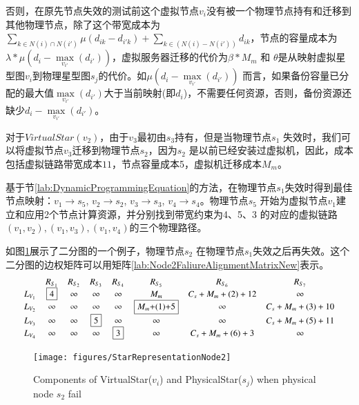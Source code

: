 否则，在原先节点失效的测试前这个虚拟节点$v_i$没有被一个物理节点持有和迁移到其他物理节点，除了这个带宽成本为${\sum\limits_{k \in N(i) \cap N(i')} {\mu({d_{ik}} - {d_{i'k}})}  + \sum\limits_{k \in \left( {N(i) - N(i')} \right)} {{d_{ik}}} }$，节点的容量成本为${\lambda * \mu({d_i} - \mathop {\max }\limits_{{v_{i'}}} \left( {{d_{i'}}} \right))}$，虚拟服务器迁移的代价为${\beta * {M_m}}$ 和 $\theta$是从映射虚拟星型图$v_i$到物理星型图$s_j$的代价。如${\mu({d_i} - \mathop {\max }\limits_{{v_{i'}}} \left( {{d_{i'}}} \right))}$ 而言，如果备份容量已分配的最大值${\mathop {\max }\limits_{{v_{i'}}} \left( {{d_{i'}}} \right)}$大于当前映射(即$d_i$)，不需要任何资源，否则，备份资源还缺少${{d_i} - \mathop {\max }\limits_{{v_{i'}}} \left( {{d_{i'}}} \right)}$。

对于$VirtualStar(v_2)$，由于$v_3$最初由$s_3$持有，但是当物理节点$s_1$ 失效时，我们可以将虚拟节点$v_3$迁移到物理节点$s_2$，因为$s_2$ 是以前已经安装过虚拟机，因此，成本包括虚拟链路带宽成本$11$，节点容量成本5，虚拟机迁移成本$M_m$。

基于节\ref{lab:DynamicProgrammingEquation}的方法，在物理节点$s_1$失效时得到最佳节点映射：$v_1 \rightarrow s_5$, $v_2 \rightarrow s_2$, $v_3 \rightarrow s_3$, $v_4 \rightarrow s_4$。物理节点$s_5$ 开始为虚拟节点$v_1$建立和应用2个节点计算资源，并分别找到带宽约束为4、5、3 的对应的虚拟链路$(v_1,v_2),(v_1,v_3),(v_1,v_4)$的三个物理路径。

如图\ref{fig:StarRepresentationNode2}展示了二分图的一个例子，物理节点$s_2$ 在物理节点$s_1$失效之后再失效。这个二分图的边权矩阵可以用矩阵\ref{lab:Node2FaliureAlignmentMatrixNew}表示。
\begin{equation*}
\small{
 {\begin{array}{*{20}{c}}
&R_{S_{1}}&R_{S_{2}}&R_{S_3}&R_{S_4}&R_{S_5}&R_{S_6}&R_{S_{7}}\\
{L_{V_1}}&\fbox{4}&\infty&\infty&\infty&M_{m}&C_{s}+M_{m}+(2)+12&\infty\\
L_{V_2}&\infty&\infty&\infty&\infty&\fbox{$M_{m}$+(1)+5}&\infty&C_{s}+M_{m}+(3)+10\\
L_{V_3}&\infty&\infty&\fbox{5}&\infty&\infty&\infty&C_{s}+M_{m}+(5)+11\\
L_{V_4}&\infty&\infty&\infty&\fbox{3}&\infty&C_{s}+M_{m}+(6)+3&\infty\\
\end{array}}
}
\label{lab:Node2FaliureAlignmentMatrixNew}
\end{equation*}

\begin{figure}
\centering
\texttt{[image: figures/StarRepresentationNode2]}\\
  \caption{Components of VirtualStar($v_i$) and PhysicalStar($s_j$) when physical node $s_2$ fail}\label{fig:StarRepresentationNode2}
\end{figure}

